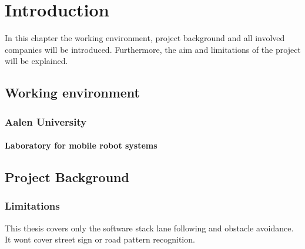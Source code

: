 \chapter{Introduction}
\label{introduction}
In this chapter the working environment, project background and all involved companies will be introduced. Furthermore, the aim and limitations of the project will be explained.

\section{Working environment}

\subsection{Aalen University}
\subsubsection{Laboratory for mobile robot systems}

\section{Project Background}



\subsection{Limitations}

This thesis covers only the software stack lane following and obstacle avoidance. It wont cover street sign or road pattern recognition.
 






















